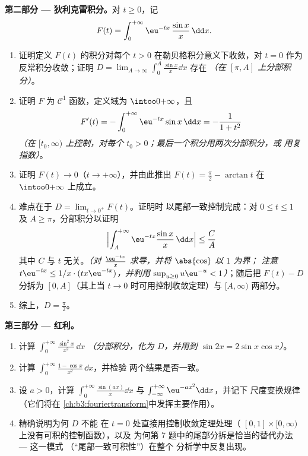 \begin{problem}
\medskip
\noindent\textbf{第二部分 --- 狄利克雷积分。}对 $t
\geq 0$，记
\[
F(t) = \int_0^{+\infty}\eu^{-tx}\,\frac{\sin x}{x}\,\dd x .
\]
\begin{enumerate}[resume]
  \item 证明定义 $F(t)$ 的积分对每个
        $t > 0$ 在勒贝格积分意义下收敛，对 $t = 0$
        作为反常积分收敛；证明 $D =
        \lim_{A\to\infty}\int_0^A\frac{\sin x}x\dd x$ 存在
        \emph{（在 $[\pi, A]$ 上分部积分）}。
  \item 证明 $F$ 为 $\mathcal C^1$ 函数，定义域为
        $\intoo0{+\infty}$，且
        \[
        F'(t) = -\int_0^{+\infty}\eu^{-tx}\sin x\,\dd x
        = -\frac{1}{1 + t^2}
        \]
        \emph{（在 $[t_0, \infty)$ 上控制，对每个 $t_0 >
        0$；最后一个积分用两次分部积分，或
        用复指数）}。
  \item 证明 $F(t) \to 0$（$t \to +\infty$），并由此推出 $F(t)
        = \frac\pi2 - \arctan t$ 在 $\intoo0{+\infty}$ 上成立。
  \item 难点在于 $D = \lim_{t\to0^+}F(t)$。证明时
        以尾部一致控制完成：对 $0 \leq t \leq 1$
        及 $A \geq \pi$，分部积分以证明
        \[
        \Bigl|\int_A^{+\infty}\eu^{-tx}\frac{\sin
        x}x\,\dd x\Bigr| \leq \frac{C}{A}
        \]
        其中 $C$ 与 $t$ 无关。\emph{（对
        $\frac{\eu^{-tx}}x$ 求导，并将 $\abs{\cos}$ 以 $1$ 为界；
        注意 $t\eu^{-tx} \leq 1/x\cdot(tx\eu^{-tx})$，并利用
        $\sup_{u\geq0}u\eu^{-u} < 1$）}；随后把 $F(t) - D$
        分拆为 $[0, A]$（其上当 $t \to 0$ 时可用控制收敛定理）与
        $[A, \infty)$ 两部分。
  \item 综上，$D = \frac\pi2$。
\end{enumerate}

\medskip
\noindent\textbf{第三部分 --- 红利。}
\begin{enumerate}[resume]
  \item 计算 $\int_0^{+\infty}\frac{\sin^2x}{x^2}\,\dd x$
        \emph{（分部积分，化为 $D$，并用到 $\sin
        2x = 2\sin x\cos x$）}。
  \item 计算 $\int_0^{+\infty}\frac{1 -
        \cos x}{x^2}\,\dd x$，并检验
        两个结果是否一致。
  \item 设 $a > 0$，计算
        $\int_0^{+\infty}\frac{\sin(ax)}x\dd x$ 与
        $\int_{-\infty}^{+\infty}\eu^{-ax^2}\dd x$，并记下
        尺度变换规律（它们将在
        \cref{ch:b3:fouriertransform}中发挥主要作用）。
  \item 精确说明为何 $D$ 不能
        在 $t = 0$ 处直接用控制收敛定理处理（
        $[0,1]\times[0,\infty)$ 上没有可积的控制函数），以及
        为何第 7 题中的尾部分拆是恰当的替代办法 --- 这一模式
        （“尾部一致可积性”）在整个
        分析学中反复出现。
\end{enumerate}


\end{problem}
